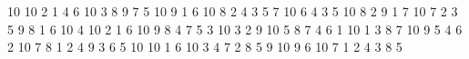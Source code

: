 10
10
2 1 4 6 10 3 8 9 7 5
10
9 1 6 10 8 2 4 3 5 7
10
6 4 3 5 10 8 2 9 1 7
10
7 2 3 5 9 8 1 6 10 4
10
2 1 6 10 9 8 4 7 5 3
10
3 2 9 10 5 8 7 4 6 1
10
1 3 8 7 10 9 5 4 6 2
10
7 8 1 2 4 9 3 6 5 10
10
1 6 10 3 4 7 2 8 5 9
10
9 6 10 7 1 2 4 3 8 5
